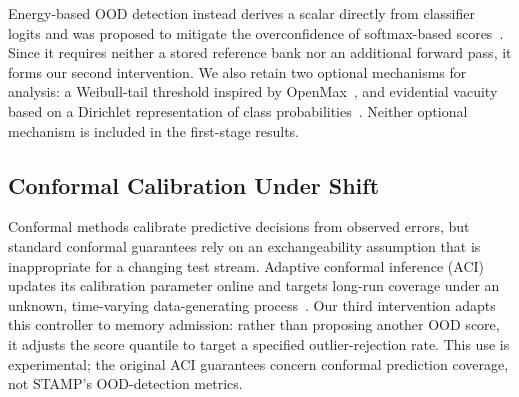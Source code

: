 Energy-based OOD detection instead derives a scalar directly from classifier
logits and was proposed to mitigate the overconfidence of softmax-based
scores~\cite{liu2020energy}. Since it requires neither a stored reference bank
nor an additional forward pass, it forms our second intervention. We also
retain two optional mechanisms for analysis: a Weibull-tail threshold inspired
by OpenMax~\cite{bendale2016openmax}, and evidential vacuity based on a
Dirichlet representation of class probabilities~\cite{sensoy2018evidential}.
Neither optional mechanism is included in the first-stage results.

\subsection{Conformal Calibration Under Shift}
Conformal methods calibrate predictive decisions from observed errors, but
standard conformal guarantees rely on an exchangeability assumption that is
inappropriate for a changing test stream. Adaptive conformal inference (ACI)
updates its calibration parameter online and targets long-run coverage under an
unknown, time-varying data-generating process~\cite{gibbs2021aci}. Our third
intervention adapts this controller to memory admission: rather than proposing
another OOD score, it adjusts the score quantile to target a specified
outlier-rejection rate. This use is experimental; the original ACI guarantees
concern conformal prediction coverage, not STAMP's OOD-detection metrics.
